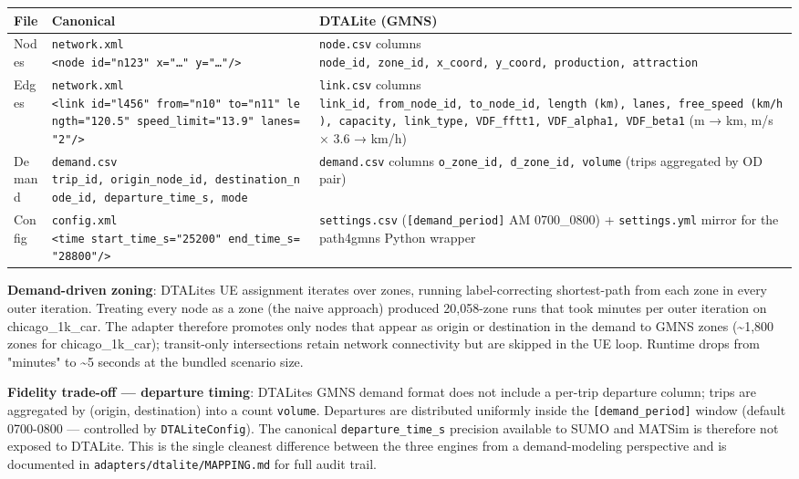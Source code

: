\begin{longtable}[]{@{}lll@{}}
\toprule\noalign{}
File & Canonical & DTALite (GMNS) \\
\midrule\noalign{}
\endhead
\bottomrule\noalign{}
\endlastfoot
Nodes & \texttt{network.xml}
\texttt{\textless{}node\ id="n123"\ x="…"\ y="…"/\textgreater{}} &
\texttt{node.csv} columns
\texttt{node\_id,\ zone\_id,\ x\_coord,\ y\_coord,\ production,\ attraction} \\
Edges & \texttt{network.xml}
\texttt{\textless{}link\ id="l456"\ from="n10"\ to="n11"\ length="120.5"\ speed\_limit="13.9"\ lanes="2"/\textgreater{}}
& \texttt{link.csv} columns
\texttt{link\_id,\ from\_node\_id,\ to\_node\_id,\ length\ (km),\ lanes,\ free\_speed\ (km/h),\ capacity,\ link\_type,\ VDF\_fftt1,\ VDF\_alpha1,\ VDF\_beta1}
(m → km, m/s × 3.6 → km/h) \\
Demand & \texttt{demand.csv}
\texttt{trip\_id,\ origin\_node\_id,\ destination\_node\_id,\ departure\_time\_s,\ mode}
& \texttt{demand.csv} columns
\texttt{o\_zone\_id,\ d\_zone\_id,\ volume} (trips aggregated by OD
pair) \\
Config & \texttt{config.xml}
\texttt{\textless{}time\ start\_time\_s="25200"\ end\_time\_s="28800"/\textgreater{}}
& \texttt{settings.csv} (\texttt{{[}demand\_period{]}} AM 0700\_0800) +
\texttt{settings.yml} mirror for the path4gmns Python wrapper \\
\end{longtable}

\textbf{Demand-driven zoning}: DTALite\textquotesingle s UE assignment
iterates over zones, running label-correcting shortest-path from each
zone in every outer iteration. Treating every node as a zone (the naive
approach) produced 20,058-zone runs that took minutes per outer
iteration on chicago\_1k\_car. The adapter therefore promotes only nodes
that appear as origin or destination in the demand to GMNS zones
(\textasciitilde1,800 zones for chicago\_1k\_car); transit-only
intersections retain network connectivity but are skipped in the UE
loop. Runtime drops from "minutes" to \textasciitilde5 seconds at the
bundled scenario size.

\textbf{Fidelity trade-off --- departure timing}:
DTALite\textquotesingle s GMNS demand format does not include a per-trip
departure column; trips are aggregated by (origin, destination) into a
count \texttt{volume}. Departures are distributed uniformly inside the
\texttt{{[}demand\_period{]}} window (default 0700-0800 --- controlled
by \texttt{DTALiteConfig}). The canonical \texttt{departure\_time\_s}
precision available to SUMO and MATSim is therefore not exposed to
DTALite. This is the single cleanest difference between the three
engines from a demand-modeling perspective and is documented in
\texttt{adapters/dtalite/MAPPING.md} for full audit trail.

